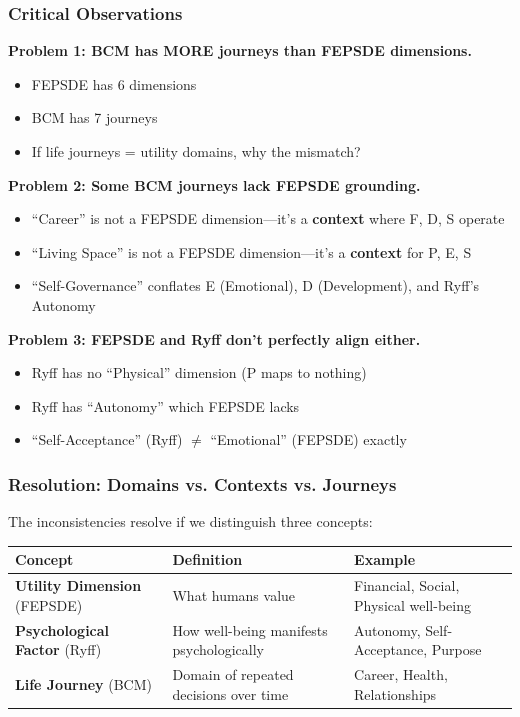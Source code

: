 \subsubsection{Critical Observations}

\begin{tcolorbox}[colback=red!5!white, colframe=red!75!black, title=Key Finding: Framework Inconsistency]

\textbf{Problem 1: BCM has MORE journeys than FEPSDE dimensions.}
\begin{itemize}[nosep]
\item FEPSDE has 6 dimensions
\item BCM has 7 journeys
\item If life journeys = utility domains, why the mismatch?
\end{itemize}

\textbf{Problem 2: Some BCM journeys lack FEPSDE grounding.}
\begin{itemize}[nosep]
\item ``Career'' is not a FEPSDE dimension---it's a \textbf{context} where F, D, S operate
\item ``Living Space'' is not a FEPSDE dimension---it's a \textbf{context} for P, E, S
\item ``Self-Governance'' conflates E (Emotional), D (Development), and Ryff's Autonomy
\end{itemize}

\textbf{Problem 3: FEPSDE and Ryff don't perfectly align either.}
\begin{itemize}[nosep]
\item Ryff has no ``Physical'' dimension (P maps to nothing)
\item Ryff has ``Autonomy'' which FEPSDE lacks
\item ``Self-Acceptance'' (Ryff) $\neq$ ``Emotional'' (FEPSDE) exactly
\end{itemize}

\end{tcolorbox}

\subsubsection{Resolution: Domains vs. Contexts vs. Journeys}

The inconsistencies resolve if we distinguish three concepts:

\begin{center}
\begin{tabular}{@{}lp{4cm}p{5cm}@{}}
\toprule
\textbf{Concept} & \textbf{Definition} & \textbf{Example} \\
\midrule
\textbf{Utility Dimension} (FEPSDE) & What humans value & Financial, Social, Physical well-being \\
\textbf{Psychological Factor} (Ryff) & How well-being manifests psychologically & Autonomy, Self-Acceptance, Purpose \\
\textbf{Life Journey} (BCM) & Domain of repeated decisions over time & Career, Health, Relationships \\
\bottomrule
\end{tabular}
\end{center}

